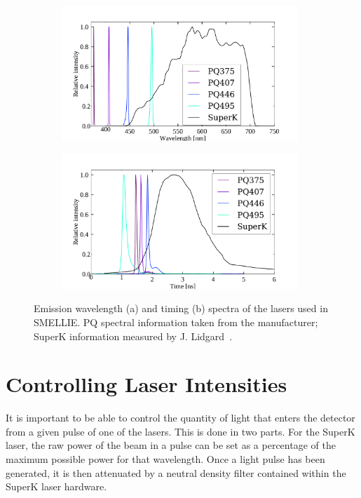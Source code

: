 \begin{figure}
    \centering
    \begin{subfigure}{0.98\textwidth}
        \centering
        \includegraphics[width=0.98\textwidth]{3_SMELLIEHardware/images/smellie_laser_wavelengths.pdf}
        \caption{}
        \label{fig:smellie_emission_wavelengths}
    \end{subfigure}
    \begin{subfigure}{0.98\textwidth}
        \centering
        \includegraphics[width=0.98\textwidth]{3_SMELLIEHardware/images/smellie_laser_timings.pdf}
        \caption{}
        \label{fig:smellie_emission_timing}
    \end{subfigure}
    \caption[Emission wavelength and timing spectra of the lasers used in SMELLIE]
    {Emission wavelength (a) and timing (b) spectra of the lasers used in SMELLIE. PQ spectral information taken from the manufacturer; SuperK information measured by J. Lidgard~\cite{lidgardSupercontinuumAdditionSMELLIE2018}.}
    \label{fig:smellie_emission_wav_timing}
\end{figure}

\section{Controlling Laser Intensities}\label{sec:smellie_attenuators}
It is important to be able to control the quantity of light that enters the detector from a given pulse of one of the lasers. This is done in two parts. For the SuperK laser, the raw power of the beam in a pulse can be set as a percentage of the maximum possible power for that wavelength. Once a light pulse has been generated, it is then attenuated by a neutral density filter contained within the SuperK laser hardware.

